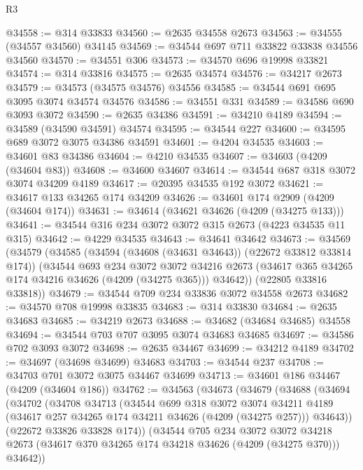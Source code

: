 \begin{lexlean}{R3}
\begin{coremodule}
@34558 := @314 @33833
@34560 := @2635 @34558 @2673
@34563 := @34555 (@34557 @34560) @34145
@34569 := @34544 @697 @711 @33822 @33838 @34556 @34560
@34570 := @34551 @306
@34573 := @34570 @696 @19998 @33821
@34574 := @314 @33816
@34575 := @2635 @34574
@34576 := @34217 @2673
@34579 := @34573 (@34575 @34576) @34556
@34585 := @34544 @691 @695 @3095 @3074 @34574 @34576
@34586 := @34551 @331
@34589 := @34586 @690 @3093 @3072
@34590 := @2635 @34386
@34591 := @34210 @4189
@34594 := @34589 (@34590 @34591) @34574
@34595 := @34544 @227
@34600 := @34595 @689 @3072 @3075 @34386 @34591
@34601 := @4204 @34535
@34603 := @34601 @83 @34386
@34604 := @4210 @34535
@34607 := @34603 (@4209 (@34604 @83))
@34608 := @34600 @34607
@34614 := @34544 @687 @318 @3072 @3074 @34209 @4189
@34617 := @20395 @34535 @192 @3072
@34621 := @34617 @133 @34265 @174 @34209
@34626 := @34601 @174 @2909 (@4209 (@34604 @174))
@34631 := @34614 (@34621 @34626 (@4209 (@34275 @133)))
@34641 := @34544 @316 @234 @3072 @3072 @315 @2673 (@4223 @34535 @11 @315)
@34642 := @4229 @34535
@34643 := @34641 @34642
@34673 := @34569
    (@34579
      (@34585
        (@34594 (@34608 (@34631 @34643)) (@22672 @33812 @33814 @174))
        (@34544
          @693
          @234
          @3072
          @3072
          @34216
          @2673
          (@34617 @365 @34265 @174 @34216 @34626 (@4209 (@34275 @365)))
          @34642))
      (@22805 @33816 @33818))
@34679 := @34544 @709 @234 @33836 @3072 @34558 @2673
@34682 := @34570 @708 @19998 @33835
@34683 := @314 @33830
@34684 := @2635 @34683
@34685 := @34219 @2673
@34688 := @34682 (@34684 @34685) @34558
@34694 := @34544 @703 @707 @3095 @3074 @34683 @34685
@34697 := @34586 @702 @3093 @3072
@34698 := @2635 @34467
@34699 := @34212 @4189
@34702 := @34697 (@34698 @34699) @34683
@34703 := @34544 @237
@34708 := @34703 @701 @3072 @3075 @34467 @34699
@34713 := @34601 @186 @34467 (@4209 (@34604 @186))
@34762 := @34563
    (@34673
      (@34679
        (@34688
          (@34694
            (@34702
              (@34708
                @34713
                (@34544
                  @699
                  @318
                  @3072
                  @3074
                  @34211
                  @4189
                  (@34617 @257 @34265 @174 @34211 @34626 (@4209 (@34275 @257)))
                  @34643))
              (@22672 @33826 @33828 @174))
            (@34544
              @705
              @234
              @3072
              @3072
              @34218
              @2673
              (@34617 @370 @34265 @174 @34218 @34626 (@4209 (@34275 @370)))
              @34642))

\end{coremodule}
\end{lexlean}
